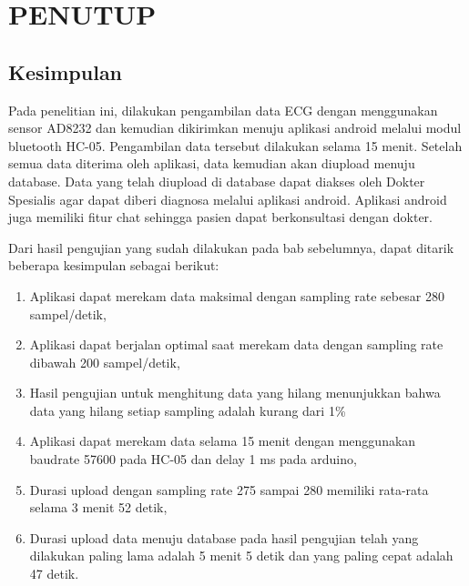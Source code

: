 \chapter{PENUTUP}
\vspace{1ex}

\section{Kesimpulan}
\vspace{1ex}
Pada penelitian ini, dilakukan pengambilan data ECG dengan menggunakan sensor AD8232 dan kemudian dikirimkan menuju aplikasi android melalui modul bluetooth HC-05. Pengambilan data tersebut dilakukan selama 15 menit. Setelah semua data diterima oleh aplikasi, data kemudian akan diupload menuju database. Data yang telah diupload di database dapat diakses oleh Dokter Spesialis agar dapat diberi diagnosa melalui aplikasi android. Aplikasi android juga memiliki fitur chat sehingga pasien dapat berkonsultasi dengan dokter.

Dari hasil pengujian yang sudah dilakukan pada bab sebelumnya, dapat ditarik beberapa kesimpulan sebagai berikut:
\begin{enumerate}[nolistsep]
	
	\item Aplikasi dapat merekam data maksimal dengan sampling rate
	sebesar 280 sampel/detik,

	
	\item Aplikasi dapat berjalan optimal saat merekam data dengan
	sampling rate dibawah 200 sampel/detik,

	
	\item Hasil pengujian untuk menghitung data yang hilang menunjukkan bahwa data yang hilang setiap sampling adalah kurang
	dari 1\%
	
	\item Aplikasi dapat merekam data selama 15 menit dengan menggunakan baudrate 57600 pada HC-05 dan delay 1 ms pada arduino,

	
	\item Durasi upload dengan sampling rate 275 sampai 280 memiliki
	rata-rata selama 3 menit 52 detik,
	
	\item Durasi upload data menuju database pada hasil pengujian telah yang dilakukan paling lama adalah 5 menit 5 detik dan
	yang paling cepat adalah 47 detik.
	

	

\end{enumerate}
\vspace{1ex}

